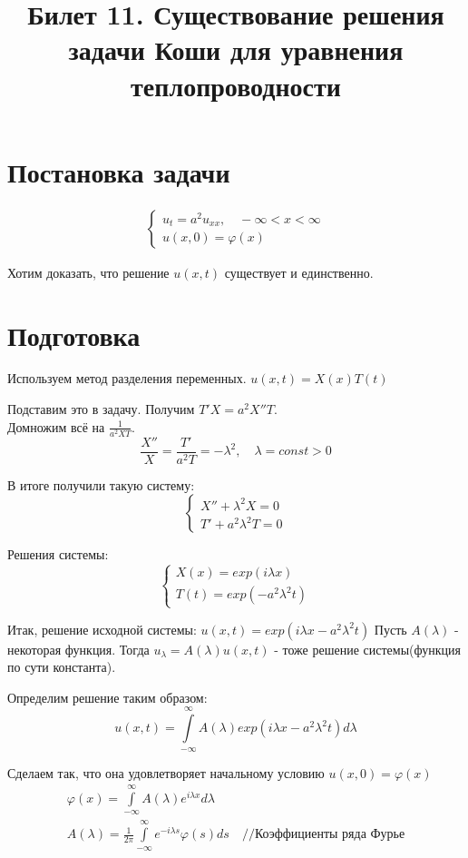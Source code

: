 \documentclass[11pt,a4paper, fqlen]{article}
\title{Билет 11. Существование  решения задачи Коши для уравнения теплопроводности}
\date{}
\begin{document}
	\maketitle
	
	\section{Постановка задачи}
	\begin{gather}
	\begin{cases}
		u_t = a^2 u_{xx}, \quad -\infty < x < \infty\\
		u(x,0) = \varphi(x)
	\end{cases}
	\end{gather}

Хотим доказать, что решение $u(x,t)$ существует и единственно.

\section{Подготовка}

	Используем метод разделения переменных. $u(x,t) = X(x)T(t)$
	
	Подставим это в задачу. Получим $T'X = a^2X''T$. \\
	Домножим всё на $\frac{1}{a^2XT}$.
	 $$\frac{X''}{X} = \frac{T'}{a^2 T} = -\lambda^2, \quad \lambda = const > 0$$
	 
	В итоге получили такую систему:
	$$
	\begin{cases}
	X'' + \lambda^2X = 0 \\
	T' + a^2\lambda^2T = 0
	\end{cases}
	$$

	Решения системы: 
	\[
	\begin{cases}
	X(x) = exp(i \lambda x)\\
	T(t) = exp(-a^2 \lambda^2 t)
	\end{cases}
	\]

	Итак, решение исходной системы: $u(x,t) = exp(i \lambda x - a^2 \lambda^2 t)$
	Пусть $A(\lambda)$ - некоторая функция. Тогда $u_\lambda = A(\lambda)  u(x,t)$ - тоже решение системы(функция по сути константа).
		
	Определим решение таким образом:
	\[
	u(x,t) = \int \limits_{-\infty}^{\infty} A(\lambda) exp(i \lambda x - a^2 \lambda^2 t) d\lambda
	\]
	
	Сделаем так, что она удовлетворяет начальному условию $u(x,0) = \varphi(x)$
	\begin{gather}
	\varphi (x) = \int \limits_{-\infty}^{\infty} A(\lambda) e^{i\lambda x} d\lambda \\	
	A(\lambda) = \frac{1}{2\pi}  \int \limits_{-\infty}^{\infty} e^{-i \lambda s} \varphi(s) ds \quad \text{//Коэффициенты ряда Фурье}
	\end{gather}
	
\end{document}
